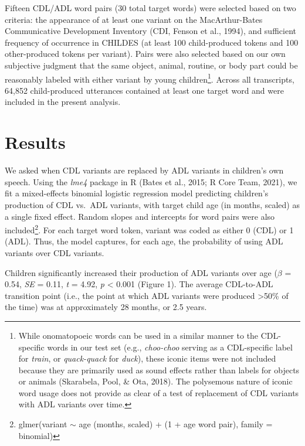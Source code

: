 \documentclass[10pt, letterpaper]{article}
\begin{document}
Fifteen CDL/ADL word pairs (30 total target words) were selected based
on two criteria: the appearance of at least one variant on the
MacArthur-Bates Communicative Development Inventory (CDI, Fenson et al.,
1994), and sufficient frequency of occurrence in CHILDES (at least 100
child-produced tokens and 100 other-produced tokens per variant). Pairs
were also selected based on our own subjective judgment that the same
object, animal, routine, or body part could be reasonably labeled with
either variant by young children\footnote{While onomatopoeic words can
  be used in a similar manner to the CDL-specific words in our test set
  (e.g., \emph{choo-choo} serving as a CDL-specific label for
  \emph{train}, or \emph{quack-quack} for \emph{duck}), these iconic
  items were not included because they are primarily used as sound
  effects rather than labels for objects or animals (Skarabela, Pool, \&
  Ota, 2018). The polysemous nature of iconic word usage does not
  provide as clear of a test of replacement of CDL variants with ADL
  variants over time.}. Across all transcripts, 64,852 child-produced
utterances contained at least one target word and were included in the
present analysis.

\hypertarget{results}{%
\section{Results}\label{results}}

We asked when CDL variants are replaced by ADL variants in children's
own speech. Using the \emph{lme4} package in R (Bates et al., 2015; R
Core Team, 2021), we fit a mixed-effects binomial logistic regression
model predicting children's production of CDL vs.~ADL variants, with
target child age (in months, scaled) as a single fixed effect. Random
slopes and intercepts for word pairs were also included\footnote{glmer(variant
  \(\sim\) age (months, scaled) + (1 + age \textbar{} word pair), family
  = binomial)}. For each target word token, variant was coded as either
0 (CDL) or 1 (ADL). Thus, the model captures, for each age, the
probability of using ADL variants over CDL variants.

Children significantly increased their production of ADL variants over
age (\(\beta\) = 0.54, \emph{SE} = 0.11, \emph{t} = 4.92, \emph{p}
\textless{} 0.001 (Figure 1). The average CDL-to-ADL transition point
(i.e., the point at which ADL variants were produced \textgreater50\% of
the time) was at approximately 28 months, or 2.5 years.
\end{document}
